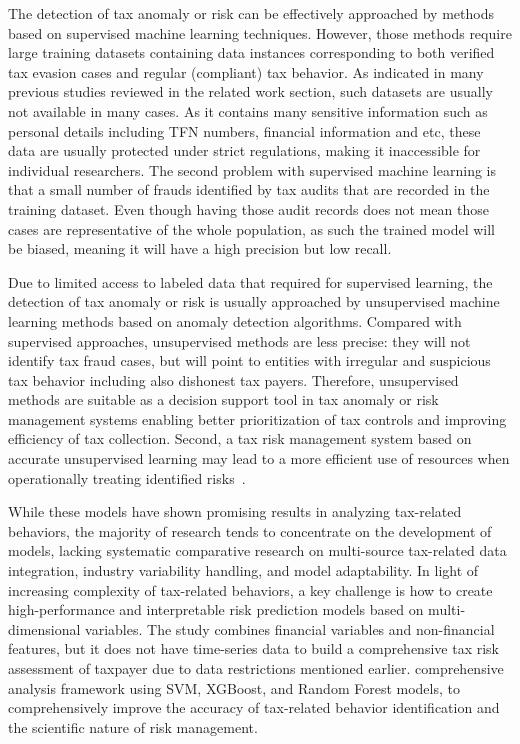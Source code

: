The detection of tax anomaly or risk can be effectively approached by methods based on supervised machine learning techniques. However, those methods require large training datasets containing data instances corresponding to both verified tax evasion cases and regular (compliant) tax behavior. As indicated in many previous studies reviewed in the related work section, such datasets are usually not available in many cases. As it contains many sensitive information such as personal details including TFN numbers, financial information and etc, these data are usually protected under strict regulations, making it inaccessible for individual researchers. The second problem with supervised machine learning is that a small number of frauds identified by tax audits that are recorded in the training dataset. Even though having those audit records does not mean those cases are representative of the whole population, as such the trained model will be biased, meaning it will have a high precision but low recall.

Due to limited access to labeled data that required for supervised learning, the detection of tax anomaly or risk is usually approached by unsupervised machine learning methods based on anomaly detection algorithms. Compared with supervised approaches, unsupervised methods are less precise: they will not identify tax fraud cases, but will point to entities with irregular and suspicious tax behavior including also dishonest tax payers. Therefore, unsupervised methods are suitable as a decision support tool in tax anomaly or risk management systems enabling better prioritization of tax controls and improving efficiency of tax collection. Second, a tax risk management system based on accurate unsupervised learning may lead to a more efficient use of resources when operationally treating identified risks~\cite{sebtaoui2020risk}.

While these models have shown promising results in analyzing tax-related behaviors, the majority of research tends to concentrate on the development of models, lacking systematic comparative research on multi-source tax-related data integration, industry variability handling, and model adaptability. In light of increasing complexity of tax-related behaviors, a key challenge is how to create high-performance and interpretable risk prediction models based on multi-dimensional variables. The study combines financial variables and non-financial features, but it does not have time-series data to build a comprehensive tax risk assessment of taxpayer due to data restrictions mentioned earlier. comprehensive analysis framework using SVM, XGBoost, and Random Forest models, to comprehensively improve the accuracy of tax-related behavior identification and the scientific nature of risk management.

